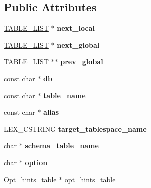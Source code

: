 \subsection*{Public Attributes}
\begin{DoxyCompactItemize}
\item 
\mbox{\label{structTABLE__LIST_ab428c76ef04d7b1eb43b0399f72d2bde}} 
\mbox{\hyperlink{structTABLE__LIST}{T\+A\+B\+L\+E\+\_\+\+L\+I\+ST}} $\ast$ {\bfseries next\+\_\+local}
\item 
\mbox{\label{structTABLE__LIST_a8e3206715feef5e95f8d2c3c3f324fa6}} 
\mbox{\hyperlink{structTABLE__LIST}{T\+A\+B\+L\+E\+\_\+\+L\+I\+ST}} $\ast$ {\bfseries next\+\_\+global}
\item 
\mbox{\label{structTABLE__LIST_a8cce1667b48e62672e10bfd0b6a516c6}} 
\mbox{\hyperlink{structTABLE__LIST}{T\+A\+B\+L\+E\+\_\+\+L\+I\+ST}} $\ast$$\ast$ {\bfseries prev\+\_\+global}
\item 
\mbox{\label{structTABLE__LIST_a1f36f086b86fb962a43578f2d9223d02}} 
const char $\ast$ {\bfseries db}
\item 
\mbox{\label{structTABLE__LIST_a0dab142947a27a3ef53874156fb6c41c}} 
const char $\ast$ {\bfseries table\+\_\+name}
\item 
\mbox{\label{structTABLE__LIST_a3e8d0818e2224b21fcf2d72a88ca4b23}} 
const char $\ast$ {\bfseries alias}
\item 
\mbox{\label{structTABLE__LIST_af8a3e97c34022c482b3c6b59564c073c}} 
L\+E\+X\+\_\+\+C\+S\+T\+R\+I\+NG {\bfseries target\+\_\+tablespace\+\_\+name}
\item 
\mbox{\label{structTABLE__LIST_acbce009a04509660a39b2a8b28e2a268}} 
char $\ast$ {\bfseries schema\+\_\+table\+\_\+name}
\item 
\mbox{\label{structTABLE__LIST_ae25c97be1433061ec31f59a6db7b5076}} 
char $\ast$ {\bfseries option}
\item 
\mbox{\hyperlink{classOpt__hints__table}{Opt\+\_\+hints\+\_\+table}} $\ast$ \mbox{\hyperlink{structTABLE__LIST_a08dcf89471efcaa22bdb31c38fa13fea}{opt\+\_\+hints\+\_\+table}}
$$
\end{DoxyCompactItemize}

